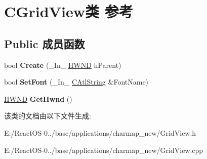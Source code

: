 \hypertarget{class_c_grid_view}{}\section{C\+Grid\+View类 参考}
\label{class_c_grid_view}
\subsection*{Public 成员函数}
\begin{DoxyCompactItemize}
\item 
\mbox{\label{class_c_grid_view_afc8cb5974333b9a2b3eb71639ccfdc12}} 
bool {\bfseries Create} (\+\_\+\+In\+\_\+ \hyperlink{interfacevoid}{H\+W\+ND} h\+Parent)
\item 
\mbox{\label{class_c_grid_view_af3a97bcc07ef327a6795ea4cd7a51472}} 
bool {\bfseries Set\+Font} (\+\_\+\+In\+\_\+ \hyperlink{class_a_t_l_1_1_c_string_t}{C\+Atl\+String} \&Font\+Name)
\item 
\mbox{\label{class_c_grid_view_a788156b94521dc87f09831d02dbf469e}} 
\hyperlink{interfacevoid}{H\+W\+ND} {\bfseries Get\+Hwnd} ()
\end{DoxyCompactItemize}


该类的文档由以下文件生成\+:\begin{DoxyCompactItemize}
\item 
E\+:/\+React\+O\+S-\/0../base/applications/charmap\+\_\+new/Grid\+View.\+h\item 
E\+:/\+React\+O\+S-\/0../base/applications/charmap\+\_\+new/Grid\+View.\+cpp\end{DoxyCompactItemize}
